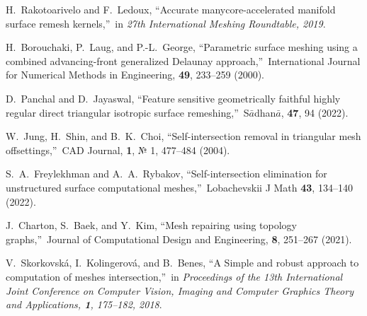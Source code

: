 \documentclass[
11pt,%
tightenlines,%
twoside,%
onecolumn,%
nofloats,%
nobibnotes,%
nofootinbib,%
superscriptaddress,%
noshowpacs,%
centertags]%
{revtex4-2}
\begin{document}
\begin{thebibliography}{99}
H.~Rakotoarivelo and F.~Ledoux, \textquotedblleft Accurate manycore-accelerated manifold surface remesh kernels,\textquotedblright \ in \textit{27th International Meshing Roundtable, 2019}.

H.~Borouchaki, P.~Laug, and P.-L.~George, \textquotedblleft Parametric surface meshing using a combined advancing-front generalized Delaunay approach,\textquotedblright \ International Journal for Numerical Methods in Engineering, {\bf 49}, 233--259 (2000).

D.~Panchal and D.~Jayaswal, \textquotedblleft Feature sensitive geometrically faithful highly regular direct triangular isotropic surface remeshing,\textquotedblright \ S$\bar{a}$dhan$\bar{a}$, {\bf 47}, 94 (2022).


W.~Jung, H.~Shin, and B.~K.~Choi, \textquotedblleft Self-intersection removal in triangular mesh offsettings,\textquotedblright \ CAD Journal, {\bf 1}, № 1, 477--484 (2004).

S.~A.~Freylekhman and A.~A.~Rybakov, \textquotedblleft Self-intersection elimination for unstructured surface computational meshes,\textquotedblright \ Lobachevskii J Math {\bf 43}, 134--140 (2022).

J.~Charton, S.~Baek, and Y.~Kim, \textquotedblleft Mesh repairing using topology graphs,\textquotedblright \ Journal of Computational Design and Engineering, {\bf 8}, 251--267 (2021).

V.~Skorkovsk\'a, I.~Kolingerov\'a, and B.~Benes, \textquotedblleft A Simple and robust approach to computation of meshes intersection,\textquotedblright \ in \textit{Proceedings of the 13th International Joint Conference on Computer Vision, Imaging and Computer Graphics Theory and Applications, {\bf 1}, 175--182, 2018}.

\end{thebibliography}
\end{document}
